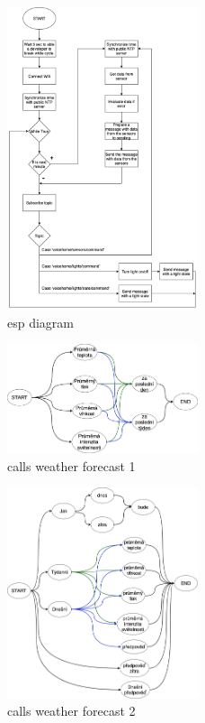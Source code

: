 \begin{figure}[H]
    \centering
    \includegraphics[width=0.5\textwidth]{img/esp_diagram.png}
    \caption{esp diagram}
\end{figure}

\begin{figure}[H]
    \centering
    \includegraphics[width=0.5\textwidth]{img/calls_weather_forecast_1.png}
    \caption{calls weather forecast 1}
\end{figure}

\begin{figure}[H]
    \centering
    \includegraphics[width=0.5\textwidth]{img/calls_weather_forecast_2.png}
    \caption{calls weather forecast 2}
\end{figure}


